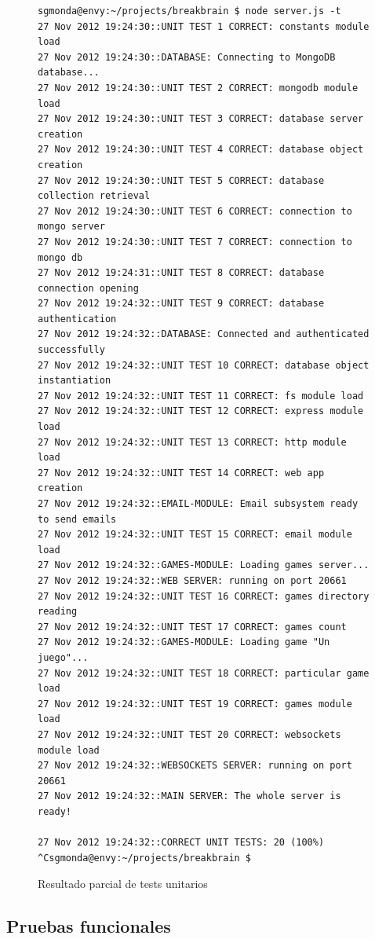\begin{figure}[h]
  \begin{center}
    
    \begin{verbatim}
sgmonda@envy:~/projects/breakbrain $ node server.js -t
27 Nov 2012 19:24:30::UNIT TEST 1 CORRECT: constants module load
27 Nov 2012 19:24:30::DATABASE: Connecting to MongoDB database...
27 Nov 2012 19:24:30::UNIT TEST 2 CORRECT: mongodb module load
27 Nov 2012 19:24:30::UNIT TEST 3 CORRECT: database server creation
27 Nov 2012 19:24:30::UNIT TEST 4 CORRECT: database object creation
27 Nov 2012 19:24:30::UNIT TEST 5 CORRECT: database collection retrieval
27 Nov 2012 19:24:30::UNIT TEST 6 CORRECT: connection to mongo server
27 Nov 2012 19:24:30::UNIT TEST 7 CORRECT: connection to mongo db
27 Nov 2012 19:24:31::UNIT TEST 8 CORRECT: database connection opening
27 Nov 2012 19:24:32::UNIT TEST 9 CORRECT: database authentication
27 Nov 2012 19:24:32::DATABASE: Connected and authenticated successfully
27 Nov 2012 19:24:32::UNIT TEST 10 CORRECT: database object instantiation
27 Nov 2012 19:24:32::UNIT TEST 11 CORRECT: fs module load
27 Nov 2012 19:24:32::UNIT TEST 12 CORRECT: express module load
27 Nov 2012 19:24:32::UNIT TEST 13 CORRECT: http module load
27 Nov 2012 19:24:32::UNIT TEST 14 CORRECT: web app creation
27 Nov 2012 19:24:32::EMAIL-MODULE: Email subsystem ready to send emails
27 Nov 2012 19:24:32::UNIT TEST 15 CORRECT: email module load
27 Nov 2012 19:24:32::GAMES-MODULE: Loading games server...
27 Nov 2012 19:24:32::WEB SERVER: running on port 20661
27 Nov 2012 19:24:32::UNIT TEST 16 CORRECT: games directory reading
27 Nov 2012 19:24:32::UNIT TEST 17 CORRECT: games count
27 Nov 2012 19:24:32::GAMES-MODULE: Loading game "Un juego"...
27 Nov 2012 19:24:32::UNIT TEST 18 CORRECT: particular game load
27 Nov 2012 19:24:32::UNIT TEST 19 CORRECT: games module load
27 Nov 2012 19:24:32::UNIT TEST 20 CORRECT: websockets module load
27 Nov 2012 19:24:32::WEBSOCKETS SERVER: running on port 20661
27 Nov 2012 19:24:32::MAIN SERVER: The whole server is ready!

27 Nov 2012 19:24:32::CORRECT UNIT TESTS: 20 (100%)
^Csgmonda@envy:~/projects/breakbrain $ 

    \end{verbatim}

    \caption{Resultado parcial de tests unitarios}
    \label{fig::unit}
  \end{center}
\end{figure}


\subsection{Pruebas funcionales}

